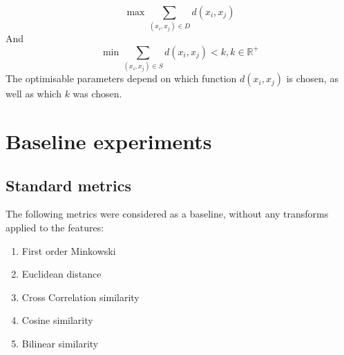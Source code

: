 \documentclass[10pt,technote]{IEEEtran}
\begin{document}
\begin{equation}
\max \sum_{(x_i, x_j) \in D} d(x_i, x_j)
\end{equation}
And
\begin{equation}
\min \sum_{(x_i, x_j) \in S} d(x_i, x_j) < k, k \in \mathbb{R^+}
\end{equation}
The optimisable parameters depend on which function $d(x_i, x_j)$ is chosen, as well as which $k$ was chosen.

\section{Baseline experiments}

\subsection{Standard metrics}
The following metrics were considered as a baseline, without any transforms applied to the features:
\begin{enumerate}
    \item First order Minkowski
    \item Euclidean distance
    \item Cross Correlation similarity
    \item Cosine similarity
    \item Bilinear similarity
\end{enumerate}
\end{document}
